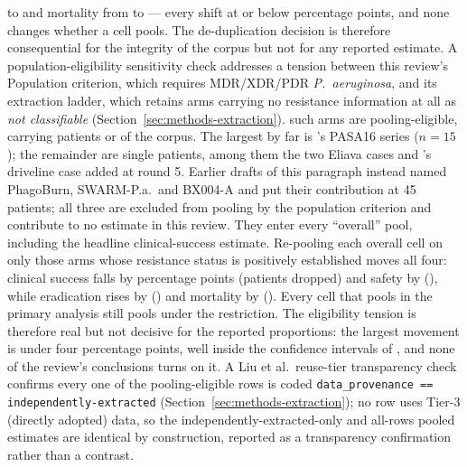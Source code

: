 \DedupEradApplied to \DedupEradRestored and mortality from \DedupMortApplied to \DedupMortRestored  --- every shift at or below \DedupMaxShiftPP percentage points, and none changes whether a cell pools. The de-duplication decision is therefore consequential for the integrity of the corpus but not for any reported estimate. A population-eligibility sensitivity check addresses a tension between this review's Population criterion, which requires MDR/XDR/PDR \textit{P.\ aeruginosa}, and its extraction ladder, which retains arms carrying no resistance information at all as \emph{not classifiable} (Section~\ref{sec:methods-extraction}). \ResNotClassifiableArms such arms are pooling-eligible, carrying \ResNotClassifiablePatients patients or \ResNotClassifiablePct of the corpus. The largest by far is \citeauthor{Onallah2023_med}'s PASA16 series ($n=15$); the remainder are single patients, among them the two \citeauthor{Zaldastanishvili2021_viruses} Eliava cases and \citeauthor{Green2023_cid}'s driveline case added at round 5. Earlier drafts of this paragraph instead named PhagoBurn, SWARM-P.a.\ and BX004-A and put their contribution at 45 patients; all three are excluded from pooling by the population criterion and contribute to no estimate in this review. They enter every ``overall'' pool, including the headline clinical-success estimate. Re-pooling each overall cell on only those arms whose resistance status is positively established moves all four: clinical success falls by \NcSensClinicalSuccessDeltaAbs percentage points (\NcSensClinicalSuccessDropped patients dropped) and safety by \NcSensSafetyDeltaAbs (\NcSensSafetyDropped ), while eradication rises by \NcSensEradicationDeltaAbs (\NcSensEradicationDropped ) and mortality by \NcSensMortalityDeltaAbs (\NcSensMortalityDropped ). Every cell that pools in the primary analysis still pools under the restriction. The eligibility tension is therefore real but not decisive for the reported proportions: the largest movement is under four percentage points, well inside the confidence intervals of , and none of the review's conclusions turns on it. A Liu et al.\ reuse-tier transparency check confirms every one of the \ArmsAnalysed pooling-eligible rows is coded \texttt{data\_provenance == independently-extracted} (Section~\ref{sec:methods-extraction}); no row uses Tier-3 (directly adopted) data, so the independently-extracted-only and all-rows pooled estimates are identical by construction, reported as a transparency confirmation rather than a contrast.

